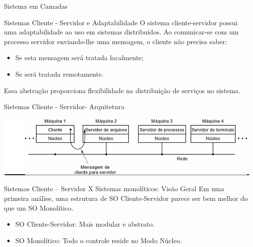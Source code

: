 \documentclass{beamer}
\begin{document}
\begin{frame}{Sistema em Camadas}
\begin{frame}{Sistemas Cliente - Servidor e Adaptabilidade}
    O sistema cliente-servidor possui uma adaptabilidade ao uso em sistemas distribuídos. Ao comunicar-se com um processo servidor enviando-lhe uma mensagem, o cliente não precisa saber:

    \begin{itemize}
        \item Se esta mensagem será tratada localmente;
        \item Se será tratada remotamente.
    \end{itemize}

    Essa abstração proporciona flexibilidade na distribuição de serviços no sistema.
\end{frame}

\begin{frame}{Sistemas Cliente - Servidor- Arquitetura}

    \vspace{1cm}
    \begin{center}
        \includegraphics[width=0.9\linewidth]{assets/aula-tads-sope/SO-cli-ser-2.png} %
    \end{center}
\end{frame}
\begin{frame}{Sistemas Cliente – Servidor X Sistemas monolíticos: Visão Geral}
    Em uma primeira análise, uma estrutura de SO Cliente-Servidor parece ser bem melhor do que um SO Monolítico.
    \begin{itemize}
        \item SO Cliente-Servidor: Mais modular e abstrato.
        \item SO Monolítico: Todo o controle reside no Modo Núcleo.
    \end{itemize}
\end{frame}


\end{frame}
\end{document}
